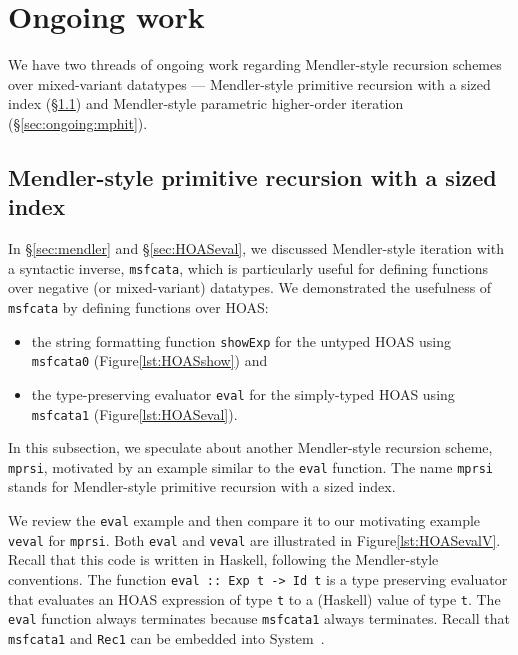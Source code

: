 \section{Ongoing work}
\label{sec:ongoing}
We have two threads of ongoing work regarding Mendler-style recursion schemes
over mixed-variant datatypes ---
Mendler-style primitive recursion with a sized index (\S\ref{sec:ongoing:mprsi})
and
Mendler-style parametric higher-order iteration (\S\ref{sec:ongoing:mphit}).

\subsection{Mendler-style primitive recursion with a sized index}
\label{sec:ongoing:mprsi}

In \S\ref{sec:mendler} and \S\ref{sec:HOASeval}, we discussed
Mendler-style iteration with a syntactic inverse, \lstinline{msfcata},
which is particularly useful for defining functions over
negative (or mixed-variant) datatypes. We demonstrated the usefulness of
\lstinline{msfcata} by defining functions over HOAS:
\begin{itemize}
\item the string formatting function \lstinline{showExp} for
	the untyped HOAS using \lstinline{msfcata0}
	(Figure\;\ref{lst:HOASshow}) and
\item the type-preserving evaluator \lstinline{eval} for
	the simply-typed HOAS using \lstinline{msfcata1}
	(Figure\;\ref{lst:HOASeval}).
\end{itemize}

In this subsection, we speculate about another Mendler-style recursion scheme,
\lstinline{mprsi}, motivated by an example similar to the \lstinline{eval}
function. The name \lstinline{mprsi} stands for
Mendler-style primitive recursion with a sized index.

We review the \lstinline{eval} example and then compare
it to our motivating example \lstinline{veval} for \lstinline{mprsi}.
Both \lstinline{eval} and \lstinline{veval} are illustrated
in Figure\;\ref{lst:HOASevalV}. Recall that this code is written in Haskell,
following the Mendler-style conventions.
The function \lstinline{eval :: Exp t -> Id t} is
a type preserving evaluator that evaluates an HOAS expression of type
\lstinline{t} to a (Haskell) value of type \lstinline{t}.
The \lstinline{eval} function always terminates because
\lstinline{msfcata1} always terminates. Recall that \lstinline{msfcata1}
and \lstinline{Rec1} can be embedded into System~\Fw.


